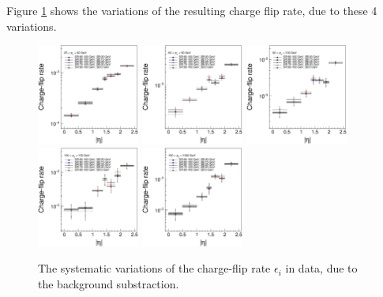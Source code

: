 Figure \ref{fig:charge_flip_sys_background_substraction} shows the variations of the resulting charge flip rate, due to these 4 variations.
\begin{figure}
\centering
\includegraphics[width=0.3\textwidth]{data/plot/charge_flip/FitPlots/data_cf_comparison_0.eps}
\includegraphics[width=0.3\textwidth]{data/plot/charge_flip/FitPlots/data_cf_comparison_1.eps}
\includegraphics[width=0.3\textwidth]{data/plot/charge_flip/FitPlots/data_cf_comparison_2.eps} \\
\includegraphics[width=0.3\textwidth]{data/plot/charge_flip/FitPlots/data_cf_comparison_3.eps}
\includegraphics[width=0.3\textwidth]{data/plot/charge_flip/FitPlots/data_cf_comparison_4.eps}
\caption{The systematic variations of the charge-flip rate $\epsilon_i$ in data, due to the background substraction.}
\label{fig:charge_flip_sys_background_substraction}
\end{figure}

